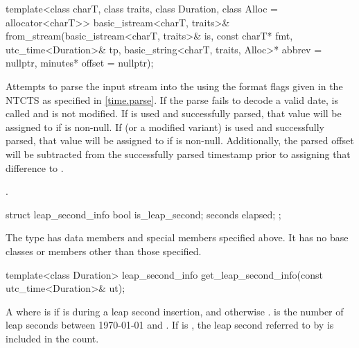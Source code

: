 %
\begin{itemdecl}
template<class charT, class traits, class Duration, class Alloc = allocator<charT>>
  basic_istream<charT, traits>&
    from_stream(basic_istream<charT, traits>& is, const charT* fmt,
                utc_time<Duration>& tp, basic_string<charT, traits, Alloc>* abbrev = nullptr,
                minutes* offset = nullptr);
\end{itemdecl}

\begin{itemdescr}
\pnum
\effects
Attempts to parse the input stream 
into the   using
the format flags given in the NTCTS 
as specified in \ref{time.parse}.
If the parse fails to decode a valid date,
 is called and
 is not modified.
If  is used and successfully parsed,
that value will be assigned to  if  is non-null.
If  (or a modified variant) is used and successfully parsed,
that value will be assigned to  if  is non-null.
Additionally, the parsed offset will be subtracted from
the successfully parsed timestamp
prior to assigning that difference to .

\pnum
\returns
{}.
\end{itemdescr}

%
\begin{itemdecl}
struct leap_second_info {
  bool    is_leap_second;
  seconds elapsed;
};
\end{itemdecl}

\begin{itemdescr}
\pnum
The type 
has data members and special members specified above.
It has no base classes or members other than those specified.
\end{itemdescr}

%
\begin{itemdecl}
template<class Duration>
  leap_second_info get_leap_second_info(const utc_time<Duration>& ut);
\end{itemdecl}

\begin{itemdescr}
\pnum
\returns
A  where  is 
if  is during a leap second insertion, and otherwise .
 is the number of leap seconds between 1970-01-01 and .
If  is ,
the leap second referred to by  is included in the count.
\end{itemdescr}

